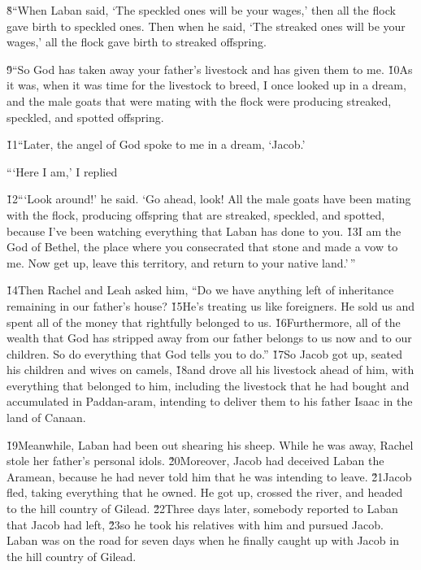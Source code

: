 \v{8}``When Laban said, `The speckled ones will be your wages,' then all the flock gave birth to speckled ones. Then when he said, `The streaked ones will be your wages,' all the flock gave birth to streaked offspring.

\v{9}``So God has taken away your father's livestock and has given them to me. \v{10}As it was, when it was time for the livestock to breed, I once looked up in a dream, and the male goats that were mating with the flock were producing streaked, speckled, and spotted offspring.

\v{11}``Later, the angel of God spoke to me in a dream, `Jacob.'

```Here I am,' I replied

\v{12}```Look around!' he said. `Go ahead, look! All the male goats have been mating with the flock, producing offspring that are streaked, speckled, and spotted, because I've been watching everything that Laban has done to you. \v{13}I am the God of Bethel, the place where you consecrated that stone and made a vow to me. Now get up, leave this territory, and return to your native land.'\,''

\v{14}Then Rachel and Leah asked him, ``Do we have anything left of inheritance remaining in our father's house? \v{15}He's treating us like foreigners. He sold us and spent all of the money that rightfully belonged to us. \v{16}Furthermore, all of the wealth that God has stripped away from our father belongs to us now and to our children. So do everything that God tells you to do.'' \v{17}So Jacob got up, seated his children and wives on camels, \v{18}and drove all his livestock ahead of him, with everything that belonged to him, including the livestock that he had bought and accumulated in Paddan-aram, intending to deliver them to his father Isaac in the land of Canaan.

\v{19}Meanwhile, Laban had been out shearing his sheep. While he was away, Rachel stole her father's personal idols. \v{20}Moreover, Jacob had deceived Laban the Aramean, because he had never told him that he was intending to leave. \v{21}Jacob fled, taking everything that he owned. He got up, crossed the river, and headed to the hill country of Gilead. \v{22}Three days later, somebody reported to Laban that Jacob had left, \v{23}so he took his relatives with him and pursued Jacob. Laban was on the road for seven days when he finally caught up with Jacob in the hill country of Gilead.

